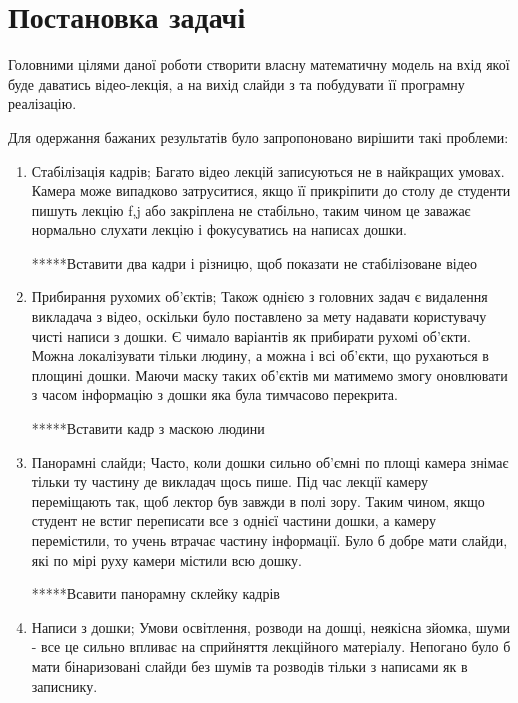 \section{Постановка задачі}

Головними цілями даної роботи створити власну математичну
модель на вхід якої буде даватись відео-лекція, а на вихід
слайди з та побудувати її програмну реалізацію.

Для одержання бажаних результатів було запропоновано
вирішити такі проблеми:
\begin{enumerate}
    \item Стабілізація кадрів;
          Багато відео лекцій записуються не в найкращих умовах. 
          Камера може випадково затруситися, якщо її прикріпити до столу
          де студенти пишуть лекцію f,j або закріплена не стабільно, таким чином 
          це заважає нормально слухати лекцію і фокусуватись на написах дошки.

          *****Вставити  два кадри і різницю, щоб показати не стабілізоване відео
    
    \item Прибирання рухомих об'єктів;
          Також однією з головних задач є видалення викладача з відео, оскільки
          було поставлено за мету надавати користувачу чисті написи з дошки.
          Є чимало варіантів як прибирати рухомі об'єкти. Можна локалізувати тільки 
          людину, а можна і всі об'єкти, що рухаються в площині дошки. Маючи 
          маску таких об'єктів ми матимемо змогу оновлювати з часом інформацію з дошки
          яка була тимчасово перекрита.

          *****Вставити кадр з маскою людини

    \item Панорамні слайди;
          Часто, коли дошки сильно об'ємні по площі камера знімає тільки ту частину де 
          викладач щось пише. Під час лекції камеру переміщають так, щоб лектор був завжди 
          в полі зору. Таким чином, якщо студент не встиг переписати все з однієї частини 
          дошки, а камеру перемістили, то учень втрачає частину інформації. Було б добре 
          мати слайди, які по мірі руху камери містили всю дошку.
          
          *****Всавити панорамну склейку кадрів

    \item Написи з дошки;
          Умови освітлення, розводи на дошці, неякісна зйомка, шуми - все це сильно впливає 
          на сприйняття лекційного матеріалу. Непогано було б мати бінаризовані слайди без 
          шумів та розводів тільки з написами як в записнику.

\end{enumerate}



